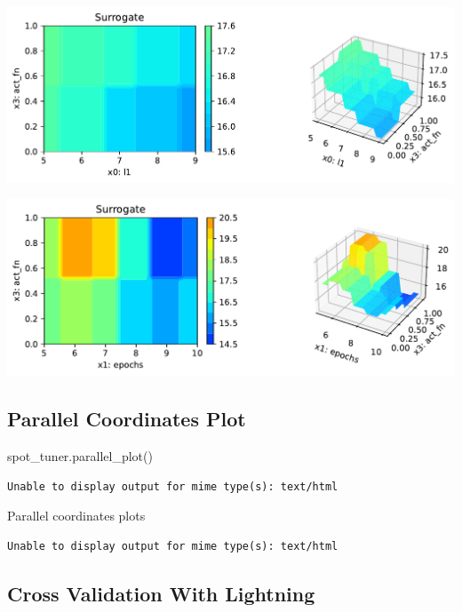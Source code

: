 \documentclass[
  letterpaper,
  DIV=11,
  numbers=noendperiod]{scrreprt}
\newenvironment{Shaded}{\begin{snugshade}}{\end{snugshade}}
\newcommand{\NormalTok}[1]{\textcolor[rgb]{0.00,0.23,0.31}{#1}}
\begin{document}
\includegraphics{033_spot_lightning_linear_sensitive_files/figure-pdf/cell-23-output-3.pdf}

\includegraphics{033_spot_lightning_linear_sensitive_files/figure-pdf/cell-23-output-4.pdf}

\subsection{Parallel Coordinates
Plot}\label{parallel-coordinates-plot-2}

\begin{Shaded}
\begin{Highlighting}[]
\NormalTok{spot\_tuner.parallel\_plot()}
\end{Highlighting}
\end{Shaded}

\begin{verbatim}
Unable to display output for mime type(s): text/html
\end{verbatim}

Parallel coordinates plots

\begin{verbatim}
Unable to display output for mime type(s): text/html
\end{verbatim}

\subsection{Cross Validation With
Lightning}\label{cross-validation-with-lightning-2}
\end{document}
